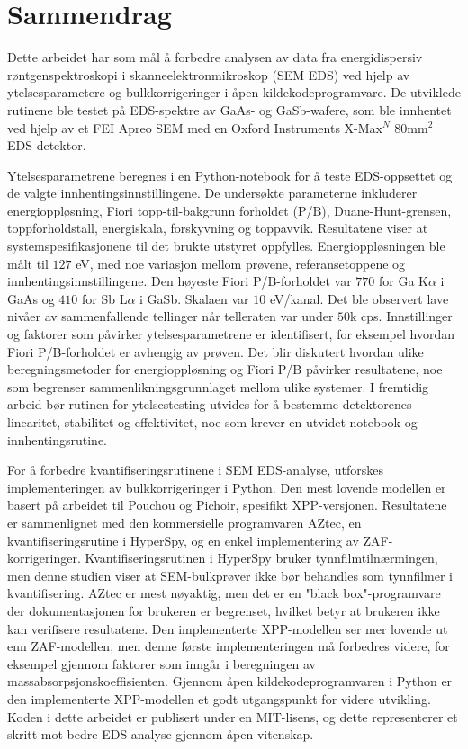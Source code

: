 \chapter*{Sammendrag}
\label{ch:Sammendrag}

Dette arbeidet har som mål å forbedre analysen av data fra energidispersiv røntgenspektroskopi i skanneelektronmikroskop (SEM EDS) ved hjelp av ytelsesparametere og bulkkorrigeringer i åpen kildekodeprogramvare. 
De utviklede rutinene ble testet på EDS-spektre av GaAs- og GaSb-wafere, som ble innhentet ved hjelp av et FEI Apreo SEM med en Oxford Instruments X-Max$^N$ $80$mm$^2$ EDS-detektor.


Ytelsesparametrene beregnes i en Python-notebook for å teste EDS-oppsettet og de valgte innhentingsinnstillingene. 
De undersøkte parameterne inkluderer energioppløsning, Fiori topp-til-bakgrunn forholdet (P/B), Duane-Hunt-grensen, toppforholdstall, energiskala, forskyvning og toppavvik. 
Resultatene viser at systemspesifikasjonene til det brukte utstyret oppfylles.
Energioppløsningen ble målt til $127$ eV, med noe variasjon mellom prøvene, referansetoppene og innhentingsinnstillingene. 
Den høyeste Fiori P/B-forholdet var $770$ for Ga K$\alpha$ i GaAs og $410$ for Sb L$\alpha$ i GaSb. 
Skalaen var $10$ eV/kanal.
Det ble observert lave nivåer av sammenfallende tellinger når telleraten var under $50$k cps. 
Innstillinger og faktorer som påvirker ytelsesparametrene er identifisert, for eksempel hvordan Fiori P/B-forholdet er avhengig av prøven. 
Det blir diskutert hvordan ulike beregningsmetoder for energioppløsning og Fiori P/B påvirker resultatene, noe som begrenser sammenlikningsgrunnlaget mellom ulike systemer.
I fremtidig arbeid bør rutinen for ytelsestesting utvides for å bestemme detektorenes linearitet, stabilitet og effektivitet, noe som krever en utvidet notebook og innhentingsrutine.


For å forbedre kvantifiseringsrutinene i SEM EDS-analyse, utforskes implementeringen av bulkkorrigeringer i Python.
Den mest lovende modellen er basert på arbeidet til Pouchou og Pichoir, spesifikt XPP-versjonen.
Resultatene er sammenlignet med den kommersielle programvaren AZtec, en kvantifiseringsrutine i HyperSpy, og en enkel implementering av ZAF-korrigeringer.
Kvantifiseringsrutinen i HyperSpy bruker tynnfilmtilnærmingen, men denne studien viser at SEM-bulkprøver ikke bør behandles som tynnfilmer i kvantifisering.
AZtec er mest nøyaktig, men det er en "black box"-programvare der dokumentasjonen for brukeren er begrenset, hvilket betyr at brukeren ikke kan verifisere resultatene.
Den implementerte XPP-modellen ser mer lovende ut enn ZAF-modellen, men denne første implementeringen må forbedres videre, for eksempel gjennom faktorer som inngår i beregningen av massabsorpsjonskoeffisienten. %
Gjennom åpen kildekodeprogramvaren i Python er den implementerte XPP-modellen et godt utgangspunkt for videre utvikling.
Koden i dette arbeidet er publisert under en MIT-lisens, og dette representerer et skritt mot bedre EDS-analyse gjennom åpen vitenskap.